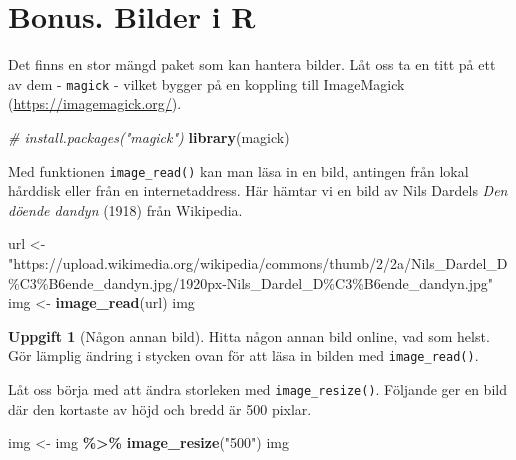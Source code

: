 \documentclass[
]{book}
\newenvironment{Shaded}{\begin{snugshade}}{\end{snugshade}}
\newcommand{\CommentTok}[1]{\textcolor[rgb]{0.56,0.35,0.01}{\textit{#1}}}
\newcommand{\FunctionTok}[1]{\textcolor[rgb]{0.13,0.29,0.53}{\textbf{#1}}}
\newcommand{\NormalTok}[1]{#1}
\newcommand{\OtherTok}[1]{\textcolor[rgb]{0.56,0.35,0.01}{#1}}
\newcommand{\SpecialCharTok}[1]{\textcolor[rgb]{0.81,0.36,0.00}{\textbf{#1}}}
\newcommand{\StringTok}[1]{\textcolor[rgb]{0.31,0.60,0.02}{#1}}
\theoremstyle{definition}
\theoremstyle{definition}
\theoremstyle{definition}
\newtheorem{exercise}{Uppgift}[chapter]
\theoremstyle{definition}
\theoremstyle{remark}
\begin{document}
\section{Bonus. Bilder i R}\label{bonus.-bilder-i-r}

Det finns en stor mängd paket som kan hantera bilder. Låt oss ta en titt på ett av dem - \texttt{magick} - vilket bygger på en koppling till ImageMagick (\url{https://imagemagick.org/}).

\begin{Shaded}
\begin{Highlighting}[]
\CommentTok{\# install.packages("magick")}
\FunctionTok{library}\NormalTok{(magick)}
\end{Highlighting}
\end{Shaded}

Med funktionen \texttt{image\_read()} kan man läsa in en bild, antingen från lokal hårddisk eller från en internetaddress. Här hämtar vi en bild av Nils Dardels \emph{Den döende dandyn} (1918) från Wikipedia.

\begin{Shaded}
\begin{Highlighting}[]
\NormalTok{url }\OtherTok{\textless{}{-}} \StringTok{"https://upload.wikimedia.org/wikipedia/commons/thumb/2/2a/Nils\_Dardel\_D\%C3\%B6ende\_dandyn.jpg/1920px{-}Nils\_Dardel\_D\%C3\%B6ende\_dandyn.jpg"}
\NormalTok{img }\OtherTok{\textless{}{-}} \FunctionTok{image\_read}\NormalTok{(url)}
\NormalTok{img}
\end{Highlighting}
\end{Shaded}

\begin{exercise}[Någon annan bild]
Hitta någon annan bild online, vad som helst. Gör lämplig ändring i stycken ovan för att läsa in bilden med \texttt{image\_read()}.
\end{exercise}

Låt oss börja med att ändra storleken med \texttt{image\_resize()}. Följande ger en bild där den kortaste av höjd och bredd är 500 pixlar.

\begin{Shaded}
\begin{Highlighting}[]
\NormalTok{img }\OtherTok{\textless{}{-}}\NormalTok{ img }\SpecialCharTok{\%\textgreater{}\%} 
  \FunctionTok{image\_resize}\NormalTok{(}\StringTok{"500"}\NormalTok{)}
\NormalTok{img}
\end{Highlighting}
\end{Shaded}
\end{document}
